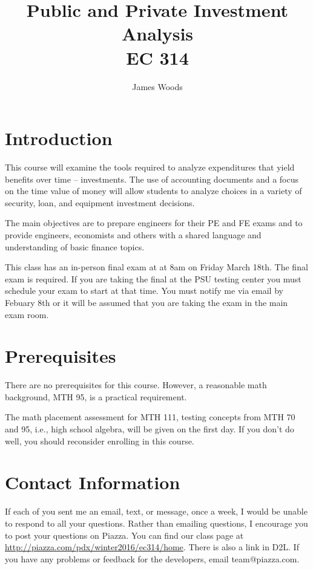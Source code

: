 \documentclass[letterpaper,10pt]{article}
\date{}
\title{Public and Private Investment Analysis\\  
EC 314\\
\Term}
\author{James Woods}
\newif\ifhybrid
\newif\ifonline
\newcommand{\Piazza}{\url{ http://piazza.com/pdx/winter2016/ec314/home}}
\newcommand{\FinalExam}{at 8am on Friday March 18th}
\newcommand{\DRCDate}{Febuary 8th }
\begin{document}
  
\maketitle

\section{Introduction}

This course will examine the tools required to analyze expenditures
that yield benefits over time -- investments. The use of accounting
documents and a focus on the time value of money will allow students
to analyze choices in a variety of security, loan, and equipment
investment decisions.

The main objectives are to prepare engineers for their PE and FE exams and to
provide engineers, economists and others with a shared language and
understanding of basic finance topics.

\ifhybrid  \fi
\ifonline  \fi

This class has an in-person final exam at \FinalExam.  The final exam is required. If you are taking the final at the PSU testing center you must schedule your exam to start at that time.  You must notify me via email by \DRCDate or it will be assumed that you are taking the exam in the main exam room.

\section{Prerequisites}

There are no prerequisites for this course. However, a reasonable math
background, MTH 95, is a practical requirement. 

\ifonline
  
  \else
    The math placement assessment for MTH 111, testing concepts from MTH 70 and 95, i.e., high school algebra, will be given on the first day.  If you don't do well, you should reconsider enrolling in this course.
\fi

\section{Contact Information}

If each of you sent me an email, text, or message, once a week, I would be unable to respond to all your questions.  Rather than emailing questions, I encourage you to post your questions on Piazza. You can find our class page at \Piazza.  There is also a link in D2L. If you have any problems or feedback for the developers, email team@piazza.com.
\end{document}
